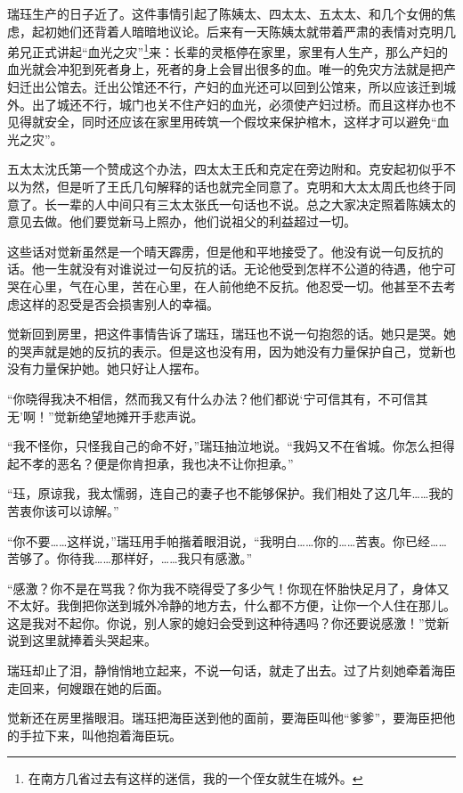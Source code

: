\par 瑞珏生产的日子近了。这件事情引起了陈姨太、四太太、五太太、和几个女佣的焦虑，起初她们还背着人暗暗地议论。后来有一天陈姨太就带着严肃的表情对克明几弟兄正式讲起“血光之灾”\footnote{在南方几省过去有这样的迷信，我的一个侄女就生在城外。}来：长辈的灵柩停在家里，家里有人生产，那么产妇的血光就会冲犯到死者身上，死者的身上会冒出很多的血。唯一的免灾方法就是把产妇迁出公馆去。迁出公馆还不行，产妇的血光还可以回到公馆来，所以应该迁到城外。出了城还不行，城门也关不住产妇的血光，必须使产妇过桥。而且这样办也不见得就安全，同时还应该在家里用砖筑一个假坟来保护棺木，这样才可以避免“血光之灾”。
\par 五太太沈氏第一个赞成这个办法，四太太王氏和克定在旁边附和。克安起初似乎不以为然，但是听了王氏几句解释的话也就完全同意了。克明和大太太周氏也终于同意了。长一辈的人中间只有三太太张氏一句话也不说。总之大家决定照着陈姨太的意见去做。他们要觉新马上照办，他们说祖父的利益超过一切。
\par 这些话对觉新虽然是一个晴天霹雳，但是他和平地接受了。他没有说一句反抗的话。他一生就没有对谁说过一句反抗的话。无论他受到怎样不公道的待遇，他宁可哭在心里，气在心里，苦在心里，在人前他绝不反抗。他忍受一切。他甚至不去考虑这样的忍受是否会损害别人的幸福。
\par 觉新回到房里，把这件事情告诉了瑞珏，瑞珏也不说一句抱怨的话。她只是哭。她的哭声就是她的反抗的表示。但是这也没有用，因为她没有力量保护自己，觉新也没有力量保护她。她只好让人摆布。
\par “你晓得我决不相信，然而我又有什么办法？他们都说‘宁可信其有，不可信其无’啊！”觉新绝望地摊开手悲声说。
\par “我不怪你，只怪我自己的命不好，”瑞珏抽泣地说。“我妈又不在省城。你怎么担得起不孝的恶名？便是你肯担承，我也决不让你担承。”
\par “珏，原谅我，我太懦弱，连自己的妻子也不能够保护。我们相处了这几年……我的苦衷你该可以谅解。”
\par “你不要……这样说，”瑞珏用手帕揩着眼泪说，“我明白……你的……苦衷。你已经……苦够了。你待我……那样好，……我只有感激。”
\par “感激？你不是在骂我？你为我不晓得受了多少气！你现在怀胎快足月了，身体又不太好。我倒把你送到城外冷静的地方去，什么都不方便，让你一个人住在那儿。这是我对不起你。你说，别人家的媳妇会受到这种待遇吗？你还要说感激！”觉新说到这里就捧着头哭起来。
\par 瑞珏却止了泪，静悄悄地立起来，不说一句话，就走了出去。过了片刻她牵着海臣走回来，何嫂跟在她的后面。
\par 觉新还在房里揩眼泪。瑞珏把海臣送到他的面前，要海臣叫他“爹爹”，要海臣把他的手拉下来，叫他抱着海臣玩。
